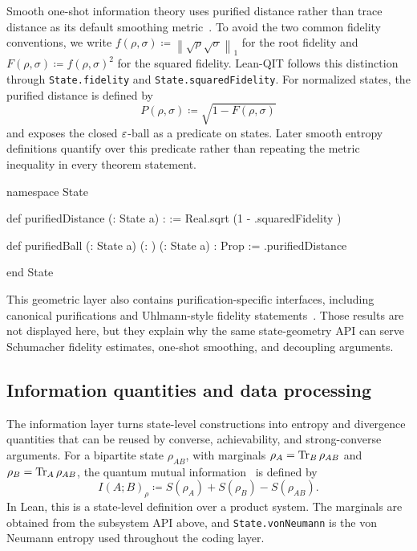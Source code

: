 \documentclass[10pt,a4paper]{article}
\begin{document}
	Smooth one-shot information theory uses purified distance rather than trace
	distance as its default smoothing metric~\cite{Tomamichel2015,Wilde2017}. To avoid the two common fidelity conventions, we write $f(\rho,\sigma) \coloneqq \left\|\sqrt{\rho}\sqrt{\sigma}\right\|_1$ for the root fidelity and $F(\rho,\sigma)\coloneqq f(\rho,\sigma)^2$ for the squared fidelity. Lean-QIT follows this distinction through \texttt{State.fidelity} and \texttt{State.squaredFidelity}. For normalized states, the purified distance is defined by
	\begin{equation}
		P(\rho,\sigma) \coloneqq\sqrt{1-F(\rho,\sigma)}
	\end{equation}
	and exposes the closed $\varepsilon$-ball as a predicate on states. Later smooth entropy definitions quantify over this predicate rather than repeating the metric inequality in every theorem statement.
	
\begin{qitleancode}[title={Purified distance and smoothing}]
namespace State

def purifiedDistance (\rho \sigma : State a) : \mathbbR :=
  Real.sqrt (1 - \rho.squaredFidelity \sigma)

def purifiedBall (\rho : State a) (\epsilon : \mathbbR) (\sigma : State a) : Prop :=
  \rho.purifiedDistance \sigma \le \epsilon

end State
\end{qitleancode}
	
	This geometric layer also contains purification-specific interfaces, including
	canonical purifications and Uhlmann-style fidelity statements~\cite{Tomamichel2015,Wilde2017}.  Those results
	are not displayed here, but they explain why the same state-geometry API can
	serve Schumacher fidelity estimates, one-shot smoothing, and decoupling
	arguments.
	
	\subsection{Information quantities and data processing}
	\label{subsec:information-dpi}
	
	The information layer turns state-level constructions into entropy and divergence quantities that can be reused by converse, achievability, and strong-converse arguments.  For a bipartite state $\rho_{AB}$, with marginals $\rho_A=\operatorname{Tr}_B\rho_{AB}$ and $\rho_B=\operatorname{Tr}_A\rho_{AB}$, the
	quantum mutual information~\cite{Wilde2017} is defined by
	\begin{equation}
		I(A;B)_\rho \coloneqq S(\rho_A)+S(\rho_B)-S(\rho_{AB}).
	\end{equation}
	In Lean, this is a state-level definition over a product system.  The
	marginals are obtained from the subsystem API above, and
	\texttt{State.vonNeumann} is the von Neumann entropy used throughout the
	coding layer.
	
\end{document}
